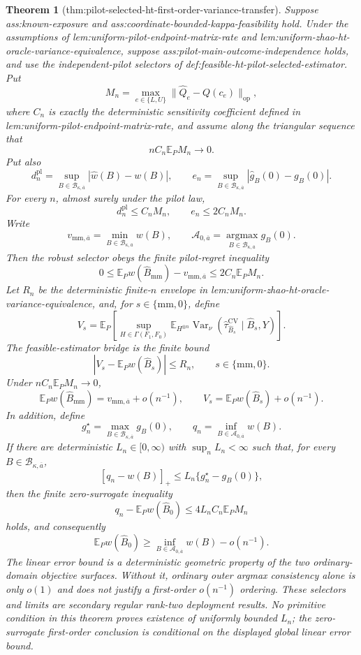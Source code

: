 \documentclass{article}
\newtheorem{theorem}{Theorem}
\begin{document}
\begin{theorem}[thm:pilot-selected-ht-first-order-variance-transfer]\label{thm:pilot-selected-ht-first-order-variance-transfer}
Suppose ass:known-exposure and ass:coordinate-bounded-kappa-feasibility hold.  Under the assumptions of lem:uniform-pilot-endpoint-matrix-rate and lem:uniform-zhao-ht-oracle-variance-equivalence, suppose ass:pilot-main-outcome-independence holds, and use the independent-pilot selectors of def:feasible-ht-pilot-selected-estimator.  Put
\[
M_n=\max_{e\in\{L,U\}}\lVert\widehat Q_e-Q(c_e)\rVert_{\mathrm{op}},
\]
where \(C_n\) is exactly the deterministic sensitivity coefficient defined in lem:uniform-pilot-endpoint-matrix-rate, and assume along the triangular sequence that
\[
nC_n\mathbb E_PM_n\longrightarrow0.
\]
Put also
\[
d_n^{\mathrm{pl}}=\sup_{B\in\mathcal B_{\kappa,\overline a}}|\widehat w(B)-w(B)|,
\qquad
e_n=\sup_{B\in\mathcal B_{\kappa,\overline a}}|\widehat g_B(0)-g_B(0)|.
\]
For every \(n\), almost surely under the pilot law,
\[
d_n^{\mathrm{pl}}\le C_nM_n,
\qquad e_n\le2C_nM_n.
\]
Write
\[
v_{\mathrm{mm},\overline a}=\min_{B\in\mathcal B_{\kappa,\overline a}}w(B),
\qquad
\mathcal A_{0,\overline a}=\operatorname*{argmax}_{B\in\mathcal B_{\kappa,\overline a}}g_B(0).
\]
Then the robust selector obeys the finite pilot-regret inequality
\[
0\le
\mathbb E_Pw(\widehat B_{\mathrm{mm}})-v_{\mathrm{mm},\overline a}
\le2C_n\mathbb E_PM_n.
\]
Let \(R_n\) be the deterministic finite-\(n\) envelope in lem:uniform-zhao-ht-oracle-variance-equivalence, and, for \(s\in\{\mathrm{mm},0\}\), define
\[
V_s=
\mathbb E_P\left[
\sup_{H\in\Gamma(F_1,F_0)}
\mathbb E_{H^{\otimes n}}
\operatorname{Var}_\nu
(\widehat\tau_{\widehat B_s}^{\mathrm{CV}}\mid\widehat B_s,Y)
\right].
\]
The feasible-estimator bridge is the finite bound
\[
|V_s-\mathbb E_Pw(\widehat B_s)|\le R_n,
\qquad s\in\{\mathrm{mm},0\}.
\]
Under \(nC_n\mathbb E_PM_n\to0\),
\[
\mathbb E_Pw(\widehat B_{\mathrm{mm}})
=v_{\mathrm{mm},\overline a}+o(n^{-1}),
\qquad
V_s=\mathbb E_Pw(\widehat B_s)+o(n^{-1}).
\]
In addition, define
\[
g_n^\star=\max_{B\in\mathcal B_{\kappa,\overline a}}g_B(0),
\qquad
q_n=\inf_{B\in\mathcal A_{0,\overline a}}w(B).
\]
If there are deterministic \(L_n\in[0,\infty)\) with \(\sup_nL_n<\infty\) such that, for every \(B\in\mathcal B_{\kappa,\overline a}\),
\[
[q_n-w(B)]_+\le L_n\{g_n^\star-g_B(0)\},
\]
then the finite zero-surrogate inequality
\[
q_n-\mathbb E_Pw(\widehat B_0)
\le4L_nC_n\mathbb E_PM_n
\]
holds, and consequently
\[
\mathbb E_Pw(\widehat B_0)
\ge\inf_{B\in\mathcal A_{0,\overline a}}w(B)-o(n^{-1}).
\]
The linear error bound is a deterministic geometric property of the two ordinary-domain objective surfaces.  Without it, ordinary outer argmax consistency alone is only \(o(1)\) and does not justify a first-order \(o(n^{-1})\) ordering.  These selectors and limits are secondary regular rank-two deployment results.  No primitive condition in this theorem proves existence of uniformly bounded \(L_n\); the zero-surrogate first-order conclusion is conditional on the displayed global linear error bound.
\end{theorem}
\end{document}
